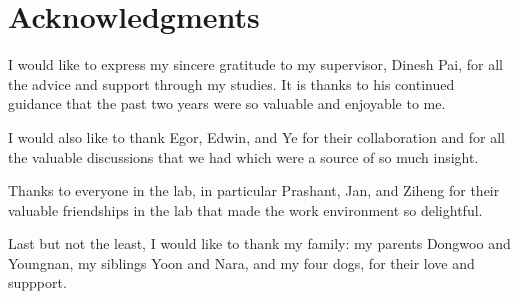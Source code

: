 
\chapter{Acknowledgments}

I would like to express my sincere gratitude to my supervisor, Dinesh Pai, for all the advice and support through my studies.
It is thanks to his continued guidance that the past two years were so valuable and enjoyable to me.

I would also like to thank Egor, Edwin, and Ye for their collaboration and for all the valuable discussions that we had which were a source of so much insight.

Thanks to everyone in the lab, in particular Prashant, Jan, and Ziheng for their valuable friendships in the lab that made the work environment so delightful.

Last but not the least, I would like to thank my family: my parents Dongwoo and Youngnan, my siblings Yoon and Nara, and my four dogs, for their love and suppport.